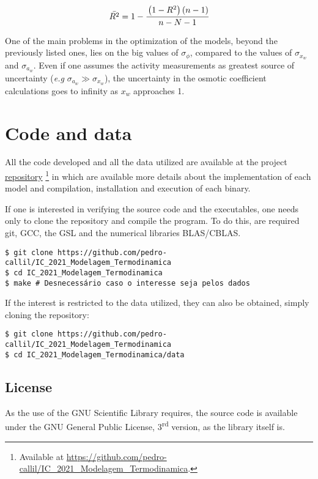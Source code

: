 \documentclass[
	12pt,				%
	openright,
	twoside,
	a4paper,			%
	brazil,			%
	french,				%
	english				%
	]{abntex2}
\begin{document}
\begin{equation}
	\bar{R^2} = 1 - \cfrac{\left( 1 - R^2 \right) \left( n - 1 \right)}
		{n - N - 1}
\end{equation}

One of the main problems in the optimization of the models, beyond the previously
listed ones, lies on the big values of $\sigma_\phi$, compared to the values of
$\sigma_{x_w}$ and $\sigma_{a_w}$. Even if one assumes the activity measurements as
greatest source of uncertainty (\textit{e.g} $\sigma_{a_w} \gg \sigma_{x_w}$), the
uncertainty in the osmotic coefficient calculations goes to infinity as $x_w$
approaches 1.

\chapter{Code and data}

All the code developed and all the data utilized are available at the project
\href{https://github.com/pedro-callil/IC_2021_Modelagem_Termodinamica}{repository}
\footnote{Available at
	\url{https://github.com/pedro-callil/IC_2021_Modelagem_Termodinamica}.}
in which are available more details about the implementation of each model and
compilation, installation and execution of each binary.

If one is interested in verifying the source code and the executables, one needs
only to clone the repository and compile the program. To do this, are required
git, GCC, the GSL and the numerical libraries BLAS/CBLAS.

\begin{verbatim}
$ git clone https://github.com/pedro-callil/IC_2021_Modelagem_Termodinamica
$ cd IC_2021_Modelagem_Termodinamica
$ make # Desnecessário caso o interesse seja pelos dados
\end{verbatim}

If the interest is restricted to the data utilized, they can also be obtained,
simply cloning the repository:

\begin{verbatim}
$ git clone https://github.com/pedro-callil/IC_2021_Modelagem_Termodinamica
$ cd IC_2021_Modelagem_Termodinamica/data
\end{verbatim}

\section{License}

As the use of the GNU Scientific Library requires, the source code is available
under the GNU General Public License, 3\textsuperscript{rd} version, as the
library itself is.
\end{document}
